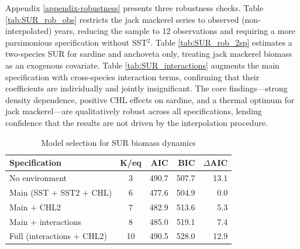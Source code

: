 \documentclass[
  11pt,
]{article}
\begin{document}
Appendix \ref{appendix-robustness} presents three robustness checks. Table \ref{tab:SUR_rob_obs} restricts the jack mackerel series to observed (non-interpolated) years, reducing the sample to 12 observations and requiring a more parsimonious specification without SST\(^2\). Table \ref{tab:SUR_rob_2sp} estimates a two-species SUR for sardine and anchoveta only, treating jack mackerel biomass as an exogenous covariate. Table \ref{tab:SUR_interactions} augments the main specification with cross-species interaction terms, confirming that their coefficients are individually and jointly insignificant. The core findings---strong density dependence, positive CHL effects on sardine, and a thermal optimum for jack mackerel---are qualitatively robust across all specifications, lending confidence that the results are not driven by the interpolation procedure.

\begin{table}[!htbp]
\centering
\caption{Model selection for SUR biomass dynamics}
\label{tab:model_selection}
\begin{tabular}{lcrrr}
\toprule
Specification & K/eq & AIC & BIC & $\Delta$AIC \\
\midrule
No environment & 3 & 490.7 & 507.7 & 13.1 \\
Main (SST + SST2 + CHL) & 6 & 477.6 & 504.9 & 0.0 \\
Main + CHL2 & 7 & 482.9 & 513.6 & 5.3 \\
Main + interactions & 8 & 485.0 & 519.1 & 7.4 \\
Full (interactions + CHL2) & 10 & 490.5 & 528.0 & 12.9 \\
\bottomrule
\end{tabular}
\end{table}
\end{document}
